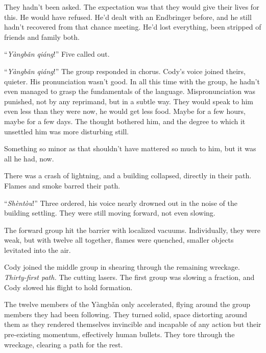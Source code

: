 They hadn't been asked.  The expectation was that they would give their lives for this.  He would have refused.  He'd dealt with an Endbringer before, and he still hadn't recovered from that chance meeting.  He'd lost everything, been stripped of friends and family both.



``\emph{Y\`{a}ngb\v{a}n qi\'{a}ng}!''  Five called out.



``\emph{Y\`{a}ngb\v{a}n qi\'{a}ng}!''  The group responded in chorus.  Cody's voice joined theirs, quieter.  His pronunciation wasn't good.  In all this time with the group, he hadn't even managed to grasp the fundamentals of the language.  Mispronunciation was punished, not by any reprimand, but in a subtle way.  They would speak to him even less than they were now, he would get less food.  Maybe for a few hours, maybe for a few days.  The thought bothered him, and the degree to which it unsettled him was more disturbing still.



Something so minor as that shouldn't have mattered so much to him, but it was all he had, now.



There was a crash of lightning, and a building collapsed, directly in their path.  Flames and smoke barred their path.



``\emph{Sh\`{e}nt\`{o}u}!''  Three ordered, his voice nearly drowned out in the noise of the building settling.  They were still moving forward, not even slowing.



The forward group hit the barrier with localized vacuums.  Individually, they were weak, but with twelve all together, flames were quenched, smaller objects levitated into the air.



Cody joined the middle group in shearing through the remaining wreckage.  \emph{Thirty-first path.  }The cutting lasers.  The first group was slowing a fraction, and Cody slowed his flight to hold formation.



The twelve members of the Y\`{a}ngb\v{a}n only accelerated, flying around the group members they had been following.  They turned solid, space distorting around them as they rendered themselves invincible and incapable of any action but their pre-existing momentum, effectively human bullets.  They tore through the wreckage, clearing a path for the rest.



